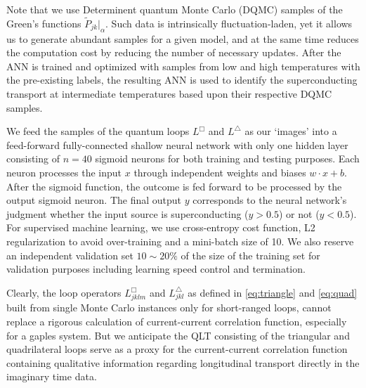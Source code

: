 \documentclass[amsmath,amssymb, aps, prl, twocolumn]{revtex4-1}
\begin{document}
Note that we use Determinent quantum Monte Carlo (DQMC) samples of the Green's functions $\widetilde{P}_{jk}|_{\alpha}$. Such data is intrinsically fluctuation-laden, yet it allows us to generate abundant samples for a given model, and at the same time reduces the computation cost by reducing the number of necessary updates\cite{qlt2016, FrankMLZ2, Simon2016, Kelvin2016}. After the ANN is trained and optimized with samples from low and high temperatures with the pre-existing labels, the resulting ANN is used to identify the superconducting transport at intermediate temperatures based upon their respective DQMC samples.  

We feed the samples of the quantum loops $L^\Box$ and $ L^\triangle$ as our `images' into a feed-forward fully-connected shallow neural network with only one hidden layer consisting of $n=40$ sigmoid neurons for both training and testing purposes. Each neuron processes the input $x$ through independent weights and biases $w\cdot x+b$. After the sigmoid function, the outcome is fed forward to be processed by the output sigmoid neuron. The final output $y$ corresponds to the neural network's judgment whether the input source is superconducting ($y>0.5$) or not ($y<0.5$).
For supervised machine learning, we use cross-entropy cost function, L2 regularization to avoid over-training and a mini-batch size of 10. We also reserve an independent validation set $10\sim 20\%$ of the size of the training set for validation purposes including learning speed control and termination\cite{MLbook}.

Clearly, the loop operators $L^\Box_{jklm}$ and $ L^\triangle_{jkl}$ as defined in \eqref{eq:triangle} and \eqref{eq:quad} built from single Monte Carlo instances only for short-ranged loops, cannot replace a rigorous calculation of current-current correlation function, especially for a gaples system. But we anticipate the QLT consisting of the triangular and quadrilateral loops serve as a proxy for the current-current correlation function containing qualitative information regarding longitudinal transport directly in the imaginary time data.  

\end{document}
